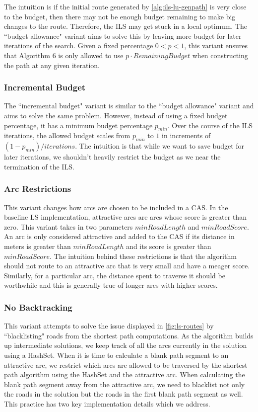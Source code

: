 \documentclass[honors]{union-cs-thesis}
\begin{document}
The intuition is if the initial route generated by \cref{alg:ils-lu-genpath} is very close to the budget, then there may not be enough budget remaining to make big changes to the route. Therefore, the ILS may get stuck in a local optimum. The ``budget allowance" variant aims to solve this by leaving more budget for later iterations of the search. Given a fixed percentage $0 < p < 1$, this variant ensures that Algorithm 6 is only allowed to use $p \cdot RemainingBudget$ when constructing the path at any given iteration. 

\subsubsection{Incremental Budget}
The ``incremental budget" variant is similar to the ``budget allowance" variant and aims to solve the same problem. However, instead of using a fixed budget percentage, it has a minimum budget percentage $p_{min}$. Over the course of the ILS iterations, the allowed budget scales from $p_{min}$ to $1$ in increments of $(1 - p_{min}) / iterations$. The intuition is that while we want to save budget for later iterations, we shouldn't heavily restrict the budget as we near the termination of the ILS.

\subsubsection{Arc Restrictions}
This variant changes how arcs are chosen to be included in a CAS. In the baseline LS implementation, attractive arcs are arcs whose score is greater than zero. This variant takes in two parameters $minRoadLength$ and $minRoadScore$. An arc is only considered attractive and added to the CAS if its distance in meters is greater than $minRoadLength$ and its score is greater than $minRoadScore$. The intuition behind these restrictions is that the algorithm should not route to an attractive arc that is very small and have a meager score. Similarly, for a particular arc, the distance spent to traverse it should be worthwhile and this is generally true of longer arcs with higher scores. 

\subsubsection{No Backtracking}
This variant attempts to solve the issue displayed in \cref{fig:ls-routes} by ``blacklisting" roads from the shortest path computations. As the algorithm builds up intermediate solutions, we keep track of all the arcs currently in the solution using a HashSet. When it is time to calculate a blank path segment to an attractive arc, we restrict which arcs are allowed to be traversed by the shortest path algorithm using the HashSet and the attractive arc. When calculating the blank path segment away from the attractive arc, we need to blacklist not only the roads in the solution but the roads in the first blank path segment as well. This practice has two key implementation details which we address.
\end{document}
